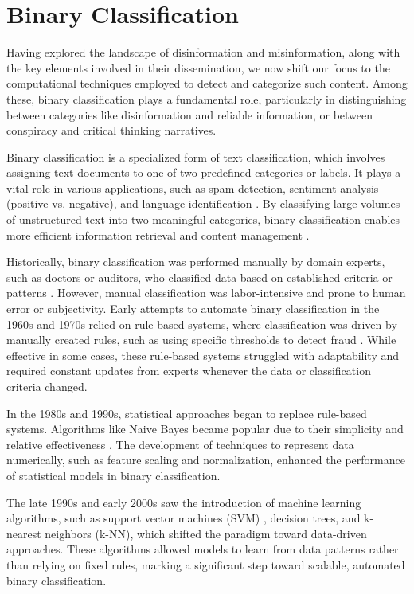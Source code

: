 \documentclass{Configuration_Files/PoliMi3i_thesis}
\begin{document}
\section{Binary Classification} \label{sec:binary_classification_task}
Having explored the landscape of disinformation and misinformation, along with the key elements involved in their dissemination, we now shift our focus to the computational techniques employed to detect and categorize such content. Among these, binary classification plays a fundamental role, particularly in distinguishing between categories like disinformation and reliable information, or between conspiracy and critical thinking narratives.

Binary classification is a specialized form of text classification, which involves assigning text documents to one of two predefined categories or labels. It plays a vital role in various applications, such as spam detection, sentiment analysis (positive vs. negative), and language identification \cite{jurafskyspeech}. By classifying large volumes of unstructured text into two meaningful categories, binary classification enables more efficient information retrieval and content management \cite{sebastiani2002machine}.

Historically, binary classification was performed manually by domain experts, such as doctors or auditors, who classified data based on established criteria or patterns \cite{jones1971makes}. However, manual classification was labor-intensive and prone to human error or subjectivity. Early attempts to automate binary classification in the 1960s and 1970s relied on rule-based systems, where classification was driven by manually created rules, such as using specific thresholds to detect fraud \cite{dale2000handbook}. While effective in some cases, these rule-based systems struggled with adaptability and required constant updates from experts whenever the data or classification criteria changed.

In the 1980s and 1990s, statistical approaches began to replace rule-based systems. Algorithms like Naive Bayes became popular due to their simplicity and relative effectiveness \cite{mitchell1997machine}. The development of techniques to represent data numerically, such as feature scaling and normalization, enhanced the performance of statistical models in binary classification. 

The late 1990s and early 2000s saw the introduction of machine learning algorithms, such as support vector machines (SVM) \cite{joachims1998text}, decision trees, and k-nearest neighbors (k-NN), which shifted the paradigm toward data-driven approaches. These algorithms allowed models to learn from data patterns rather than relying on fixed rules, marking a significant step toward scalable, automated binary classification.
\end{document}
